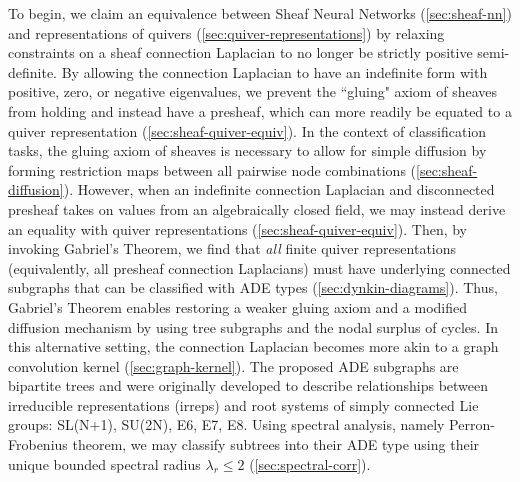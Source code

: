 \documentclass{article}
\theoremstyle{definition}
\begin{document}
To begin, we claim an equivalence between Sheaf Neural Networks (\cref{sec:sheaf-nn}) and representations of quivers (\cref{sec:quiver-representations}) by relaxing constraints on a sheaf connection Laplacian to no longer be strictly positive semi-definite. 
By allowing the connection Laplacian to have an indefinite form with positive, zero, or negative eigenvalues, we prevent the ``gluing" axiom of sheaves from holding and instead have a presheaf, which can more readily be equated to a quiver representation (\cref{sec:sheaf-quiver-equiv}). 
In the context of classification tasks, the gluing axiom of sheaves is necessary to allow for simple diffusion by forming restriction maps between all pairwise node combinations (\cref{sec:sheaf-diffusion}). 
However, when an indefinite connection Laplacian and disconnected presheaf takes on values from an algebraically closed field, we may instead derive an equality with quiver representations (\cref{sec:sheaf-quiver-equiv}). Then, by invoking Gabriel's Theorem, we find that \textit{all} finite quiver representations (equivalently, all presheaf connection Laplacians) must have underlying connected subgraphs that can be classified with ADE types (\cref{sec:dynkin-diagrams}). 
Thus, Gabriel's Theorem enables restoring a weaker gluing axiom and a modified diffusion mechanism by using tree subgraphs and the nodal surplus of cycles. 
In this alternative setting, the connection Laplacian becomes more akin to a graph convolution kernel (\cref{sec:graph-kernel}).
The proposed ADE subgraphs are bipartite trees and were originally developed to describe relationships between irreducible representations (irreps) and root systems of simply connected Lie groups: SL(N+1), SU(2N), E6, E7, E8. 
Using spectral analysis, namely Perron-Frobenius theorem, we may classify subtrees into their ADE type using their unique bounded spectral radius $\lambda_r \leq 2$ (\cref{sec:spectral-corr}). 
\end{document}
